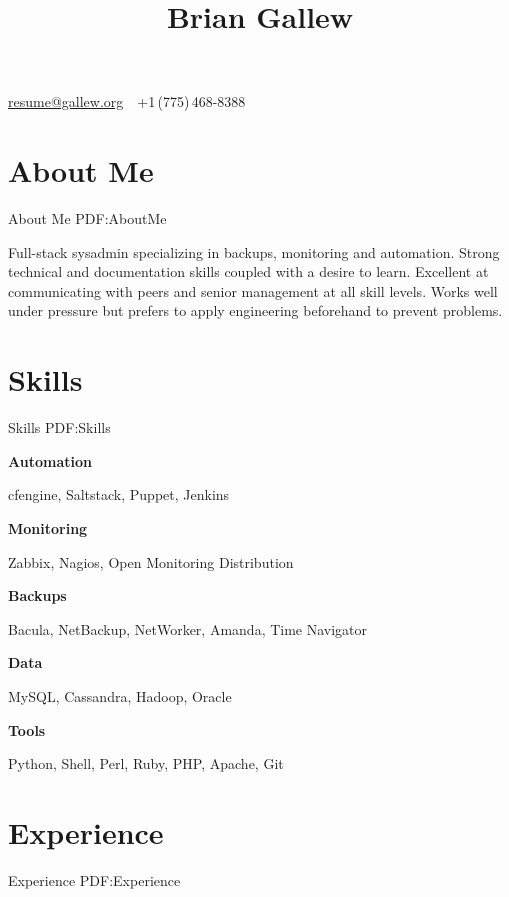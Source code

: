 \documentclass[letterpaper,10pt,oneside]{article}
\begin{document}

\title{Brian Gallew}

\begin{subtitle}
\par
\href{mailto:resume@gallew.org}
{resume@gallew.org}
\,\BulletSymbol\,
+1\,(775)\,468-8388
\end{subtitle}

\begin{body}


\section
{About Me}
{About Me}
{PDF:AboutMe}

Full-stack sysadmin specializing in backups, monitoring and automation.
Strong technical and documentation skills coupled with a desire to learn.
Excellent at communicating with peers and senior management at all skill
levels.  Works well under pressure but prefers to apply engineering
beforehand to prevent problems.


\section
{Skills}
{Skills}
{PDF:Skills}

\textbf{Automation}\par
cfengine, Saltstack, Puppet, Jenkins
\SmallEntryGap

\textbf{Monitoring}\par
Zabbix, Nagios, Open Monitoring Distribution
\SmallEntryGap

\textbf{Backups}\par
Bacula, NetBackup, NetWorker, Amanda, Time Navigator
\SmallEntryGap

\textbf{Data}\par
MySQL, Cassandra, Hadoop, Oracle
\SmallEntryGap

\textbf{Tools}\par
Python, Shell, Perl, Ruby, PHP, Apache, Git
\SmallEntryGap


\section
{Experience}
{Experience}
{PDF:Experience}


\end{body}
\end{document}
